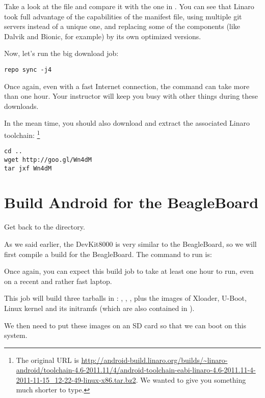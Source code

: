 Take a look at the  file and compare it with
the one in . You can see that Linaro
took full advantage of the capabilities of the manifest file, using multiple
git servers instead of a unique one, and replacing some of the components
(like Dalvik and Bionic, for example) by its own optimized versions.

Now, let's run the big download job:
\begin{verbatim}
repo sync -j4
\end{verbatim}

Once again, even with a fast Internet connection, the  command can
take more than one hour. Your instructor will keep you busy with other things
during these downloads.

In the mean time, you should also download and extract the associated Linaro toolchain:
\footnote{The original URL is
\url{http://android-build.linaro.org/builds/~linaro-android/toolchain-4.6-2011.11/4/android-toolchain-eabi-linaro-4.6-2011.11-4-2011-11-15_12-22-49-linux-x86.tar.bz2}. We wanted to give you something much shorter
to type.}
\begin{verbatim}
cd ..
wget http://goo.gl/Wn4dM
tar jxf Wn4dM
\end{verbatim}

\section{Build Android for the BeagleBoard}

Get back to the  directory.

As we said earlier, the DevKit8000 is very similar to the BeagleBoard, so we
will first compile a build for the BeagleBoard. The command to run is:


Once again, you can expect this build job to take at least one hour to run,
even on a recent and rather fast laptop.

This job will build three tarballs in :
, , , plus the images of Xloader,
U-Boot, Linux kernel and its initramfs (which are also contained in
).

We then need to put these images on an SD card so that we can boot on this system.

